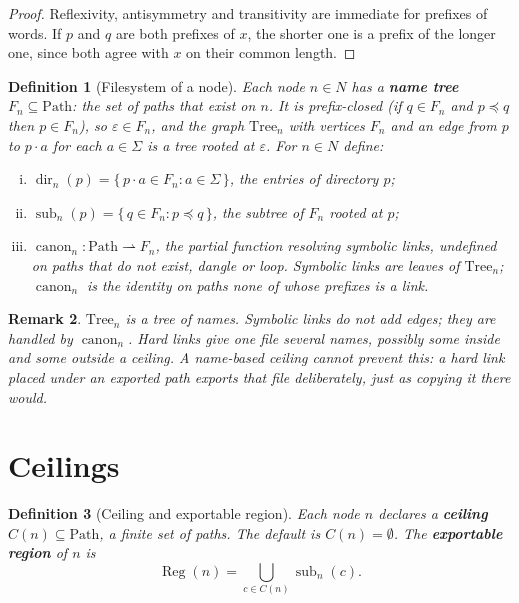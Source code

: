 \documentclass[11pt]{article}
\newcommand{\Path}{\text{Path}}
\newcommand{\Tree}{\text{Tree}}
\DeclareMathOperator{\dir}{dir}
\DeclareMathOperator{\sub}{sub}
\DeclareMathOperator{\Reg}{Reg}
\DeclareMathOperator{\canon}{canon}
\theoremstyle{definitionbreak}
\newtheorem{definition}{Definition}[section]
\theoremstyle{plainbreak}
\theoremstyle{remarkbreak}
\newtheorem{remark}[definition]{Remark}
\begin{document}
\begin{proof}
Reflexivity, antisymmetry and transitivity are immediate for prefixes of words. If $p$ and $q$
are both prefixes of $x$, the shorter one is a prefix of the longer one, since both agree with
$x$ on their common length.
\end{proof}

\begin{definition}[Filesystem of a node]\label{def:fs}
Each node $n \in N$ has a \textbf{name tree} $F_n \subseteq \Path$: the set of paths that exist
on $n$. It is prefix-closed (if $q \in F_n$ and $p \preceq q$ then $p \in F_n$), so
$\varepsilon \in F_n$, and the graph $\Tree_n$ with vertices $F_n$ and an edge from $p$ to
$p \cdot a$ for each $a \in \Sigma$ is a tree rooted at $\varepsilon$. For $n \in N$ define:
\begin{enumerate}[(i)]
    \item $\dir_n(p) = \{\, p \cdot a \in F_n : a \in \Sigma \,\}$, the entries of directory $p$;
    \item $\sub_n(p) = \{\, q \in F_n : p \preceq q \,\}$, the subtree of $F_n$ rooted at $p$;
    \item $\canon_n : \Path \rightharpoonup F_n$, the partial function resolving symbolic links,
    undefined on paths that do not exist, dangle or loop. Symbolic links are leaves of
    $\Tree_n$; $\canon_n$ is the identity on paths none of whose prefixes is a link.
\end{enumerate}
\end{definition}

\begin{remark}
$\Tree_n$ is a tree of \emph{names}. Symbolic links do not add edges; they are handled by
$\canon_n$. Hard links give one file several names, possibly some inside and some outside a
ceiling. A name-based ceiling cannot prevent this: a hard link placed under an exported path
exports that file deliberately, just as copying it there would.
\end{remark}

\section{Ceilings}

\begin{definition}[Ceiling and exportable region]
Each node $n$ declares a \textbf{ceiling} $C(n) \subseteq \Path$, a finite set of paths. The
default is $C(n) = \emptyset$. The \textbf{exportable region} of $n$ is
\[
    \Reg(n) = \bigcup_{c \in C(n)} \sub_n(c).
\]
\end{definition}
\end{document}
